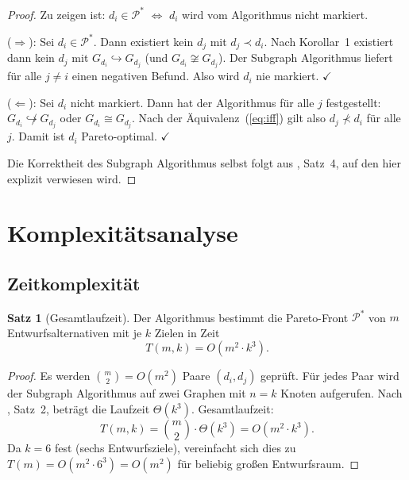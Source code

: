 ﻿\documentclass[a4paper,12pt]{article}
\theoremstyle{definition}
\newtheorem{satz}{Satz}
\begin{document}
\begin{proof}
    Zu zeigen ist: $d_i \in \mathcal{P}^*$ $\iff$ $d_i$ wird vom Algorithmus
    nicht markiert.

    ($\Rightarrow$): Sei $d_i \in \mathcal{P}^*$. Dann existiert kein $d_j$
    mit $d_j \prec d_i$. Nach Korollar~1 existiert dann kein $d_j$ mit
    $G_{d_i} \hookrightarrow G_{d_j}$ (und $G_{d_i} \not\cong G_{d_j}$).
    Der Subgraph Algorithmus liefert f\"{u}r alle $j \neq i$ einen negativen
    Befund. Also wird $d_i$ nie markiert. $\checkmark$

    ($\Leftarrow$): Sei $d_i$ nicht markiert. Dann hat der Algorithmus f\"{u}r
    alle $j$ festgestellt: $G_{d_i} \not\hookrightarrow G_{d_j}$ oder
    $G_{d_i} \cong G_{d_j}$. Nach der \"{A}quivalenz~(\ref{eq:iff}) gilt also
    $d_j \not\prec d_i$ f\"{u}r alle $j$. Damit ist $d_i$ Pareto-optimal. $\checkmark$

    Die Korrektheit des Subgraph Algorithmus selbst folgt aus
    \cite{epp2026subgraph}, Satz~4, auf den hier explizit verwiesen wird.
\end{proof}

\section{Komplexit\"{a}tsanalyse}

\subsection{Zeitkomplexit\"{a}t}

\begin{satz}[Gesamtlaufzeit]\label{satz:laufzeit}
    Der Algorithmus bestimmt die Pareto-Front $\mathcal{P}^*$ von
    $m$ Entwurfsalternativen mit je $k$ Zielen in Zeit
    \[
        T(m, k) = O(m^2 \cdot k^3).
    \]
\end{satz}

\begin{proof}
    Es werden $\binom{m}{2} = O(m^2)$ Paare $(d_i, d_j)$ gepr\"{u}ft.
    F\"{u}r jedes Paar wird der Subgraph Algorithmus auf zwei Graphen mit
    $n = k$ Knoten aufgerufen. Nach \cite{epp2026subgraph}, Satz~2, betr\"{a}gt
    die Laufzeit $\Theta(k^3)$.
    Gesamtlaufzeit:
    \[
        T(m, k) = \binom{m}{2} \cdot \Theta(k^3) = O(m^2 \cdot k^3).
    \]
    Da $k = 6$ fest (sechs Entwurfsziele), vereinfacht sich dies zu
    $T(m) = O(m^2 \cdot 6^3) = O(m^2)$ f\"{u}r beliebig gro{\ss}en Entwurfsraum.
\end{proof}
\end{document}
